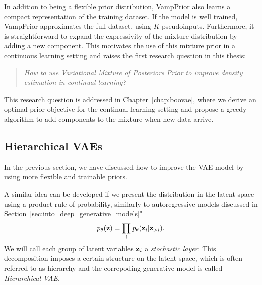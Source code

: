In addition to being a flexible prior distribution, VampPrior also learns a compact representation of the training dataset. If the model is well trained, VampPrior approximates the full dataset, using $K$ pseudoinputs. 
Furthermore, it is straightforward to expand the expressivity of the mixture distribution by adding a new component.
This motivates the use of this mixture prior in a continuous learning setting and raises the first research question in this thesis:

\begin{quote}
	\textit{How to use Variational Mixture of Posteriors Prior to improve density estimation in continual learning?}
\end{quote}
This research question is addressed in Chapter~\ref{chap:boovae}, where we derive an optimal prior objective for the continual learning setting and propose a greedy algorithm to add components to the mixture when new data arrive. 


\subsection{Hierarchical VAEs}
In the previous section, we have discussed how to improve the VAE model by using more flexible and trainable priors.

A similar idea can be developed if we present the distribution in the latent space using a product rule of probability, similarly to autoregressive models discussed in Section~\ref{sec:into_deep_generative_models}"
\begin{equation}
    p_{\theta}({\mathbf{z}}) = \prod_i p_{\theta}({\mathbf{z}}_i|{\mathbf{z}}_{>i}).
\end{equation}
We will call each group of latent variables ${\mathbf{z}}_i$ a \textit{stochastic layer}. This decomposition imposes a certain structure on the latent space, which is often referred to as hierarchy and the correpoding generative model is called \textit{Hierarchical VAE}. 






